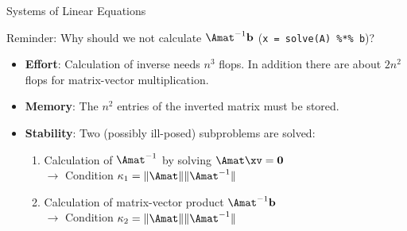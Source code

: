 \documentclass[11pt,compress,t,notes=noshow, xcolor=table]{beamer}
\begin{document}
\begin{vbframe}{Systems of Linear Equations}







\framebreak

Reminder: Why should we not calculate $\Amat^{-1} \mathbf{b}$ (\texttt{x = solve(A) \%*\% b})?

\begin{itemize}
\item \textbf{Effort}: Calculation of inverse needs $n^3$ flops. In addition there are about $2n^2$ flops for matrix-vector multiplication.
\item \textbf{Memory}: The $n^2$ entries of the inverted matrix must be stored.

\item \textbf{Stability}: Two (possibly ill-posed) subproblems are solved: 
  \begin{enumerate}
  \item Calculation of $\Amat^{-1}$ by solving $\Amat \xv = \mathbf{0}$ \\
  $\to$ Condition $\kappa_1 = \|\Amat\|\|\Amat^{-1}\|$
  \item Calculation of matrix-vector product $\Amat^{-1}\mathbf{b}$\\
  $\to$ Condition $\kappa_2 = \|\Amat\|\|\Amat^{-1}\|$
  \end{enumerate}


\end{itemize}
\end{vbframe}
\end{document}
